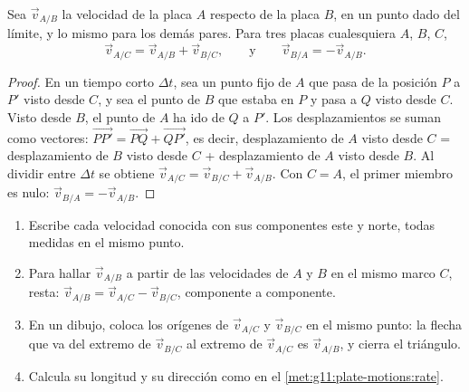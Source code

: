 \begin{proposition}\label{prop:g11:plate-motions:sum}
Sea $\vec v_{A/B}$ la velocidad de la placa $A$ respecto de la placa $B$, en
un punto dado del límite, y lo mismo para los demás pares. Para tres placas
cualesquiera $A$, $B$, $C$,
\[
  \vec v_{A/C} = \vec v_{A/B} + \vec v_{B/C},
  \qquad\text{y}\qquad
  \vec v_{B/A} = -\vec v_{A/B}.
\]
\end{proposition}

\begin{proof}
En un tiempo corto $\Delta t$, sea un punto fijo de $A$ que pasa de la
posición $P$ a $P'$ visto desde $C$, y sea el punto de $B$ que estaba en $P$
y pasa a $Q$ visto desde $C$. Visto desde $B$, el punto de $A$ ha ido de $Q$
a $P'$. Los desplazamientos se suman como vectores:
$\overrightarrow{PP'} = \overrightarrow{PQ} + \overrightarrow{QP'}$, es decir,
desplazamiento de $A$ visto desde $C$ = desplazamiento de $B$ visto desde $C$
+ desplazamiento de $A$ visto desde $B$. Al dividir entre $\Delta t$ se
obtiene $\vec v_{A/C}
= \vec v_{B/C} + \vec v_{A/B}$. Con $C = A$, el primer miembro es nulo: $\vec
v_{B/A} = -\vec v_{A/B}$.
\end{proof}

\begin{method}\label{met:g11:plate-motions:triangle}
\begin{enumerate}
  \item Escribe cada velocidad conocida con sus componentes este y norte,
        todas medidas en el mismo punto.
  \item Para hallar $\vec v_{A/B}$ a partir de las velocidades de $A$ y $B$ en
        el mismo marco $C$, resta: $\vec v_{A/B} = \vec v_{A/C} - \vec v_{B/C}$,
        componente a componente.
  \item En un dibujo, coloca los orígenes de $\vec v_{A/C}$ y $\vec v_{B/C}$
        en el mismo punto: la flecha que va del extremo de $\vec v_{B/C}$ al
        extremo de $\vec v_{A/C}$ es $\vec v_{A/B}$, y cierra el triángulo.
  \item Calcula su longitud y su dirección como en el
        \cref{met:g11:plate-motions:rate}.
\end{enumerate}
\end{method}

